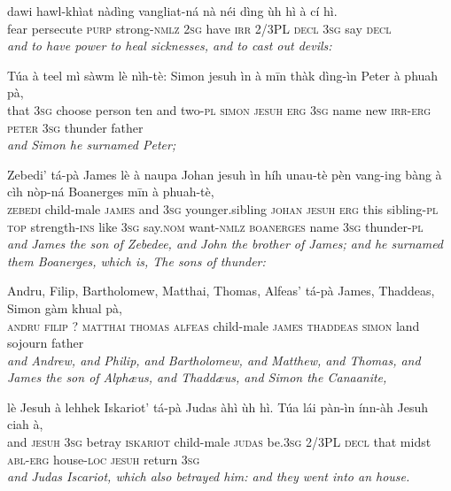 \documentclass[11pt,a4paper]{article}
\begin{document}
\begin{exe}
\gll dawi hawl-khìat nàdìng vangliat-ná nà néi dìng ùh hì à cí hì. \\
     fear persecute \textsc{purp} strong-\textsc{nmlz} \textsc{2sg} have \textsc{irr} 2/3PL \textsc{decl} \textsc{3sg} say \textsc{decl} \\
\glt \textcolor{kjvcolor}{\textit{and to have power to heal sicknesses, and to cast out devils:}}

\gll Túa à teel mì sàwm lè nìh-tè: Simon jesuh ìn à mīn thàk dìng-ìn Peter à phuah pà, \\
     that \textsc{3sg} choose person ten and two-\textsc{pl} \textsc{simon} \textsc{jesuh} \textsc{erg} \textsc{3sg} name new \textsc{irr}-\textsc{erg} \textsc{peter} \textsc{3sg} thunder father \\
\glt \textcolor{kjvcolor}{\textit{and Simon he surnamed Peter;}}

\gll Zebedi' tá-pà James lè à naupa Johan jesuh ìn híh unau-tè pèn vang-ing bàng à cìh nòp-ná Boanerges mīn à phuah-tè, \\
     \textsc{zebedi} child-male \textsc{james} and \textsc{3sg} younger.sibling \textsc{johan} \textsc{jesuh} \textsc{erg} this sibling-\textsc{pl} \textsc{top} strength-\textsc{ins} like \textsc{3sg} say.\textsc{nom} want-\textsc{nmlz} \textsc{boanerges} name \textsc{3sg} thunder-\textsc{pl} \\
\glt \textcolor{kjvcolor}{\textit{and James the son of Zebedee, and John the brother of James; and he surnamed them Boanerges, which is, The sons of thunder:}}

\gll Andru, Filip, Bartholomew, Matthai, Thomas, Alfeas' tá-pà James, Thaddeas, Simon gàm khual pà, \\
     \textsc{andru} \textsc{filip} ? \textsc{matthai} \textsc{thomas} \textsc{alfeas} child-male \textsc{james} \textsc{thaddeas} \textsc{simon} land sojourn father \\
\glt \textcolor{kjvcolor}{\textit{and Andrew, and Philip, and Bartholomew, and Matthew, and Thomas, and James the son of Alphæus, and Thaddæus, and Simon the Canaanite,}}

\gll lè Jesuh à lehhek Iskariot' tá-pà Judas àhì ùh hì. Túa lái pàn-ìn ínn-àh Jesuh ciah à, \\
     and \textsc{jesuh} \textsc{3sg} betray \textsc{iskariot} child-male \textsc{judas} be.\textsc{3sg} 2/3PL \textsc{decl} that midst \textsc{abl}-\textsc{erg} house-\textsc{loc} \textsc{jesuh} return \textsc{3sg} \\
\glt \textcolor{kjvcolor}{\textit{and Judas Iscariot, which also betrayed him: and they went into an house.}}


\end{exe}
\end{document}
